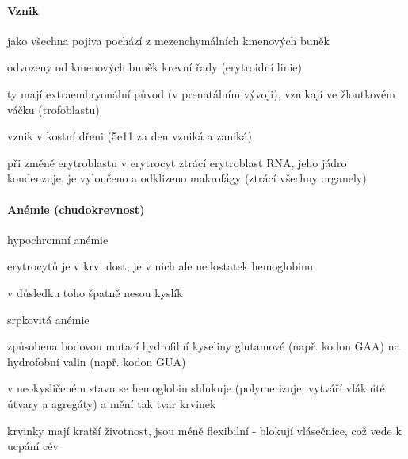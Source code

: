 \documentclass[DIV=8]{scrreprt}
\begin{document}
\paragraph{Vznik}
\begin{myItemize}[nosep]
    \item jako všechna pojiva pochází z mezenchymálních kmenových buněk
    \item odvozeny od kmenových buněk krevní řady (erytroidní linie)
\begin{myItemize}[nosep]
    \item ty mají extraembryonální původ (v prenatálním vývoji), vznikají ve žloutkovém váčku (trofoblastu)
\end{myItemize}

    \item vznik v kostní dřeni (\si{5e11} za den vzniká a zaniká)
    \item při změně erytroblastu v erytrocyt ztrácí erytroblast RNA, jeho jádro kondenzuje, je vyloučeno a odklizeno makrofágy (ztrácí všechny organely)
\end{myItemize}



\paragraph{Anémie (chudokrevnost)}
\begin{myItemize}[nosep]
    \item hypochromní anémie
\begin{myItemize}[nosep]
    \item erytrocytů je v krvi dost, je v nich ale nedostatek hemoglobinu
    \item v důsledku toho špatně nesou kyslík
\end{myItemize}

    \item srpkovitá anémie
\begin{myItemize}[nosep]
    \item způsobena bodovou mutací hydrofilní kyseliny glutamové (např. kodon GAA) na hydrofobní valin (např. kodon GUA)
    \item v neokysličeném stavu se hemoglobin shlukuje (polymerizuje, vytváří vláknité útvary a agregáty) a mění tak tvar krvinek
    \item krvinky mají kratší životnost, jsou méně flexibilní - blokují vlásečnice, což vede k ucpání cév
\end{myItemize}

\end{myItemize}
\end{document}
